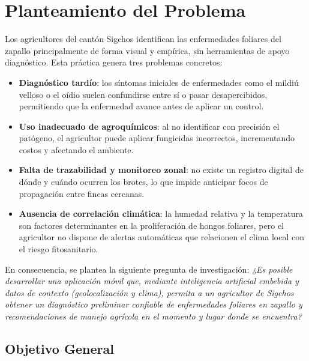 \documentclass[12pt,a4paper]{article}
\begin{document}
\section{Planteamiento del Problema}

Los agricultores del cantón Sigchos identifican las enfermedades foliares del
zapallo principalmente de forma visual y empírica, sin herramientas de apoyo
diagnóstico. Esta práctica genera tres problemas concretos:

\begin{itemize}
  \item \textbf{Diagnóstico tardío}: los síntomas iniciales de enfermedades
        como el mildiú velloso o el oídio suelen confundirse entre sí o pasar
        desapercibidos, permitiendo que la enfermedad avance antes de aplicar
        un control.
  \item \textbf{Uso inadecuado de agroquímicos}: al no identificar con
        precisión el patógeno, el agricultor puede aplicar fungicidas
        incorrectos, incrementando costos y afectando el ambiente.
  \item \textbf{Falta de trazabilidad y monitoreo zonal}: no existe un registro
        digital de dónde y cuándo ocurren los brotes, lo que impide anticipar
        focos de propagación entre fincas cercanas.
  \item \textbf{Ausencia de correlación climática}: la humedad relativa y la
        temperatura son factores determinantes en la proliferación de hongos
        foliares, pero el agricultor no dispone de alertas automáticas que
        relacionen el clima local con el riesgo fitosanitario.
\end{itemize}

En consecuencia, se plantea la siguiente pregunta de investigación:
\textit{¿Es posible desarrollar una aplicación móvil que, mediante inteligencia
artificial embebida y datos de contexto (geolocalización y clima), permita a un
agricultor de Sigchos obtener un diagnóstico preliminar confiable de
enfermedades foliares en zapallo y recomendaciones de manejo agrícola en el
momento y lugar donde se encuentra?}

\subsection{Objetivo General}
\end{document}
